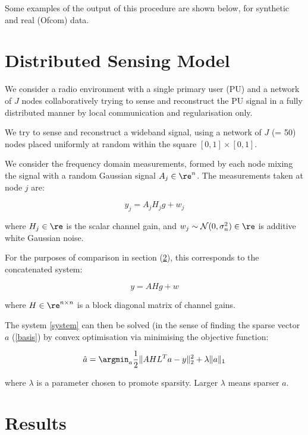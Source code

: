 Some examples of the output of this procedure are shown below, for synthetic and real (Ofcom) data.

\section{Distributed Sensing Model}\label{sec:sensingmodel}

We consider a radio environment with a single primary user (PU) and a network of \(J\) nodes collaboratively trying to sense and reconstruct the PU signal in a fully distributed manner by local communication and regularisation only.

We try to sense and reconstruct a wideband signal, using a network of \(J\) (= 50) nodes placed uniformly at random within the square \(  \left[0,1\right]\times \left[0,1\right] \). 

We consider the frequency domain measurements, formed by each node mixing the signal with a random Gaussian signal \(A_j \in \re^n\). The measurements taken at node \(j\) are:

\begin{equation}
y_j = A_jH_jg + w_j
\label{dist_system}
\end{equation}

where \(H_j \in \re\) is the scalar channel gain, and \(w_j \sim \mathcal{N}(0,\sigma^2_n) \in \re \) is additive white Gaussian noise. 

For the purposes of comparison in section (\ref{sec:results}), this corresponds to the concatenated system:

\begin{equation}
y = AHg + w
\label{system}
\end{equation}

where \(H \in \re^{n \times n}\) is a block diagonal matrix of channel gains.

The system  \ref{system} can then be solved (in the sense of finding the sparse vector \(a\) (\ref{basis}) by convex optimisation via minimising the objective function:

\begin{equation}
\hat{a} = \argmin_{a} \frac{1}{2}\|AHL^{T}a-y\|_2^2 + \lambda \|a\|_1
\label{opt}
\end{equation}

where \(\lambda\) is a parameter chosen to promote sparsity. Larger \(\lambda\) means sparser \(a\).

\section{Results} \label{sec:results}

